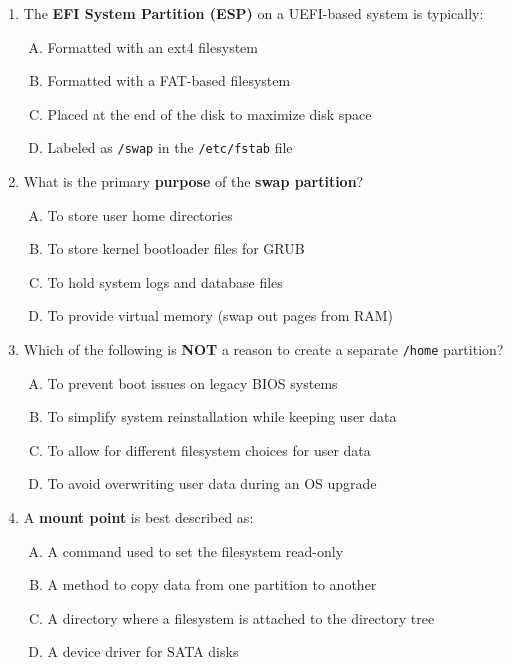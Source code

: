 \documentclass[a4paper]{report}
\begin{document}
\begin{enumerate}[1.]
    \item The \textbf{EFI System Partition (ESP)} on a UEFI-based system is typically:  
    \begin{enumerate}[A)]
        \item Formatted with an ext4 filesystem  
        \item Formatted with a FAT-based filesystem  
        \item Placed at the end of the disk to maximize disk space  
        \item Labeled as \texttt{/swap} in the \texttt{/etc/fstab} file  
    \end{enumerate}

    \item What is the primary \textbf{purpose} of the \textbf{swap partition}?  
    \begin{enumerate}[A)]
        \item To store user home directories  
        \item To store kernel bootloader files for GRUB  
        \item To hold system logs and database files  
        \item To provide virtual memory (swap out pages from RAM)  
    \end{enumerate}

    \item Which of the following is \textbf{NOT} a reason to create a separate \texttt{/home} partition?  
    \begin{enumerate}[A)]
        \item To prevent boot issues on legacy BIOS systems  
        \item To simplify system reinstallation while keeping user data  
        \item To allow for different filesystem choices for user data  
        \item To avoid overwriting user data during an OS upgrade  
    \end{enumerate}

    \item A \textbf{mount point} is best described as:  
    \begin{enumerate}[A)]
        \item A command used to set the filesystem read-only  
        \item A method to copy data from one partition to another  
        \item A directory where a filesystem is attached to the directory tree  
        \item A device driver for SATA disks  
    \end{enumerate}


\end{enumerate}
\end{document}

